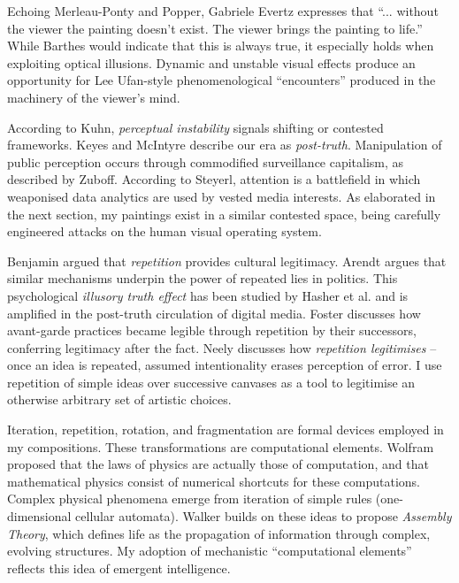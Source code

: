 \documentclass[12pt]{article}
\begin{document}
Echoing Merleau-Ponty\cite{merleauPonty1962phenomenology} and
Popper,\cite{popper1972objective} Gabriele Evertz expresses that
``... without the viewer the painting doesn't exist. The viewer brings
the painting to life.''\cite{evertz09documentary} While Barthes
would indicate that this is always true,\cite{barthes1977death} it
especially holds when exploiting optical illusions. Dynamic and
unstable visual effects produce an opportunity for Lee Ufan-style
phenomenological ``encounters''\cite[pp.~52--6]{encounter} produced in
the machinery of the viewer's mind.

According to Kuhn, \emph{perceptual instability} signals shifting or
contested frameworks.\cite[p.~64]{kuhn1970structure}
Keyes\cite{keyes2004posttruth} and
McIntyre\cite{mcintyre2018posttruth} describe our era as
\emph{post-truth}. Manipulation of public perception occurs through
commodified surveillance capitalism, as described by
Zuboff.\cite[pp.~8--12]{zuboff2019surveillance} According to
Steyerl,\cite{steyerl2016sea} attention is a battlefield in which
weaponised data analytics are used by vested media interests. As
elaborated in the next section, my paintings exist in a similar
contested space, being carefully engineered attacks on the human visual
operating system.

Benjamin argued that \emph{repetition} provides cultural
legitimacy.\cite{benjamin1935kunstwerk} Arendt argues that similar
mechanisms underpin the power of repeated lies in
politics.\cite{arendt1972lying} This psychological \emph{illusory
  truth effect} has been studied by Hasher et
al.\cite{hasher1977frequency} and is amplified in the
post-truth\cite{keyes2004posttruth,mcintyre2018posttruth} circulation
of digital
media.\cite{zuboff2019surveillance} Foster\cite[pp.~29--30]{foster1996return}
discusses how avant-garde practices became legible through repetition
by their successors, conferring legitimacy after the fact. Neely
discusses how \emph{repetition legitimises} -- once an idea is repeated,
assumed intentionality erases perception of
error.\cite{neely-repetition} I use repetition of simple ideas over
successive canvases as a tool to legitimise an otherwise arbitrary set
of artistic choices.

Iteration, repetition, rotation, and fragmentation are formal devices
employed in my compositions. These transformations are computational
elements. Wolfram proposed that the laws of physics
are actually those of computation, and that mathematical physics
consist of numerical shortcuts for these computations.\cite{wolfram1984} Complex
physical phenomena emerge from iteration of simple rules
(one-dimensional cellular automata).\cite{wolfram}
Walker builds on these ideas to propose
\emph{Assembly Theory}, which defines life as the propagation of
information through complex, evolving structures.\cite{walker2024life} My adoption of
mechanistic ``computational elements'' reflects this idea of
emergent intelligence.
\end{document}

